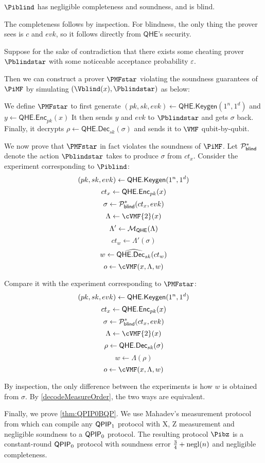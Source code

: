 \begin{thm}
	\label{thm:BlindBQP}
	$\Piblind$ has negligible completeness and soundness, and is blind.
\end{thm}
\begin{prf}
	The completeness follows by inspection.
	For blindness, the only thing the prover sees is $c$ and $evk$, so it follows directly from $\mathsf{QHE}$'s security.
	
	Suppose for the sake of contradiction that there exists some cheating prover $\Pblindstar$ with some noticeable acceptance probability $\varepsilon$.

	Then we can construct a prover $\PMFstar$ violating the soundness guarantees of $\PiMF$ by simulating $(\Vblind(x), \Pblindstar)$ as below:

	We define $\PMFstar$ to first generate
	$(pk, sk, evk)\leftarrow\mathsf{QHE.Keygen}(1^n, 1^d)$
	and
	$y\leftarrow\mathsf{QHE.Enc}_{pk}(x)$
	It then sends $y$ and $evk$ to $\Pblindstar$ and gets $\sigma$ back.
	Finally, it decrypts
	$\rho\leftarrow\mathsf{QHE.Dec}_{sk}(\sigma)$
	and sends it to $\VMF$ qubit-by-qubit.

	We now prove that $\PMFstar$ in fact violates the soundness of $\PiMF$.
	Let $\mathcal{P}_{\mathsf{blind}}^*$ denote the action $\Pblindstar$ takes to produce $\sigma$ from $ct_x$.
	Consider the experiment corresponding to $\Piblind$:
	$$(pk, sk, evk)\leftarrow\mathsf{QHE.Keygen}(1^n, 1^d)$$
	$$ct_x\leftarrow\mathsf{QHE.Enc}_{pk}(x)$$
	$$\sigma\leftarrow\mathcal{P}_{\mathsf{blind}}^*(ct_x, evk)$$
	$$\Lambda\leftarrow\cVMF{2}(x)$$
	$$\Lambda'\leftarrow{\cal M}_{\mathsf{QHE}}(\Lambda)$$
	$$ct_w\leftarrow\Lambda'(\sigma)$$
	$$w\leftarrow\widehat{\mathsf{QHE.Dec}_{sk}}(ct_w)$$
	$$o\leftarrow\cVMF(x, \Lambda, w)$$

	Compare it with the experiment corresponding to $\PMFstar$:
	$$(pk, sk, evk)\leftarrow\mathsf{QHE.Keygen}(1^n, 1^d)$$
	$$ct_x\leftarrow\mathsf{QHE.Enc}_{pk}(x)$$
	$$\sigma\leftarrow\mathcal{P}_{\mathsf{blind}}^*(ct_x, evk)$$
	$$\Lambda\leftarrow\cVMF{2}(x)$$
	$$\rho\leftarrow\mathsf{QHE.Dec}_{sk}(\sigma)$$
	$$w\leftarrow\Lambda(\rho)$$
	$$o\leftarrow\cVMF(x, \Lambda, w)$$

	By inspection, the only difference between the experiments is how $w$ is obtained from $\sigma$.
	By \cref{decodeMeasureOrder}, the two ways are equivalent.
\end{prf}


Finally, we prove \cref{thm:QPIP0BQP}.
We use Mahadev's measurement protocol from \cite{FOCS:Mahadev18a} which can compile any $\operatorname{\mathsf{QPIP}}_1$ protocol with X, Z measurement and negligible soundness to a $\operatorname{\mathsf{QPIP}}_0$ protocol.
The resulting protocol $\Pibz$ is a constant-round $\operatorname{\mathsf{QPIP}}_0$ protocol with soundness error $\frac{3}{4} + \operatorname{negl}(n)$ and negligible completeness.

